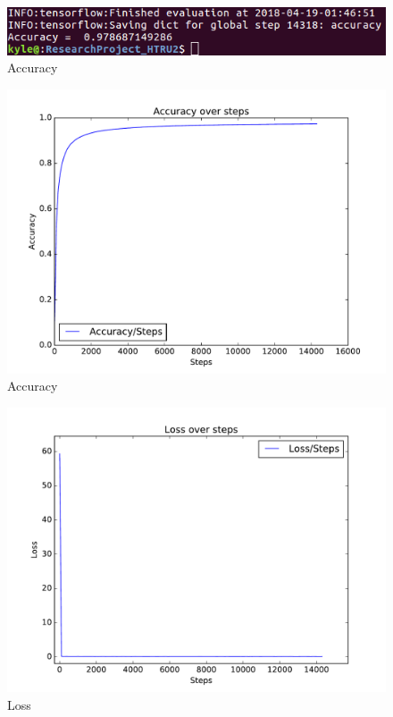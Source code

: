 \documentclass{article}
\begin{document}
  \begin{figure}[H]
  \caption{Accuracy}\label{img:term_acc}
  \begin{center}
  \includegraphics[scale=0.75]{../images/accuracy_percent_small}
  \end{center}
  \end{figure}
  \begin{figure}[H]
  \caption{Accuracy}\label{img:accuracy}
  \begin{center}
  \includegraphics[scale=0.75]{../images/Accuracy}
  \end{center}
  \end{figure}
  \begin{figure}[H]
  \caption{Loss}\label{img:loss}
  \begin{center}
  \includegraphics[scale=0.75]{../images/Loss}
  \end{center}
  \end{figure}
\end{document}
